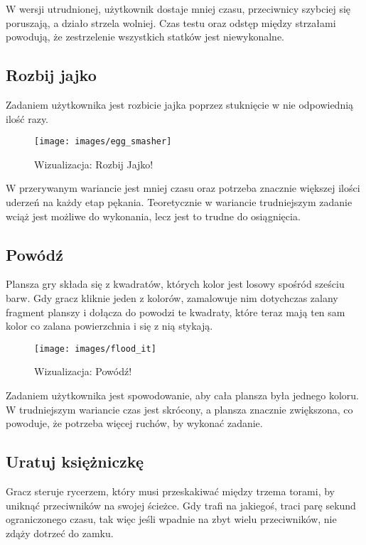 \documentclass[openright]{xmgr}
\begin{document}
W wersji utrudnionej, użytkownik dostaje mniej czasu, przeciwnicy szybciej
się poruszają, a działo strzela wolniej. Czas testu oraz odstęp między
strzałami powodują, że zestrzelenie wszystkich statków jest niewykonalne.

\subsection{Rozbij jajko}
Zadaniem użytkownika jest rozbicie jajka poprzez stuknięcie w nie
odpowiednią ilość razy.

\begin{figure}[h]
\centering
\texttt{[image: images/egg\_smasher]}
\caption{Wizualizacja: Rozbij Jajko!}
\label{fig:egg_smasher}
\end{figure}

W przerywanym wariancie jest mniej czasu oraz potrzeba znacznie większej
ilości uderzeń na każdy etap pękania. Teoretycznie w wariancie trudniejszym
zadanie wciąż jest możliwe do wykonania, lecz jest to trudne do osiągnięcia.

\subsection{Powódź}
Plansza gry składa się z kwadratów, których kolor jest losowy spośród sześciu
barw. Gdy gracz kliknie jeden z kolorów, zamalowuje nim dotychczas zalany
fragment planszy i dołącza do powodzi te kwadraty, które
teraz mają ten sam kolor co zalana powierzchnia i się z nią stykają.


\begin{figure}[h]
\centering
\texttt{[image: images/flood\_it]}
\caption{Wizualizacja: Powódź!}
\label{fig:flood_it}
\end{figure}

Zadaniem użytkownika jest spowodowanie, aby cała plansza była jednego koloru.
W trudniejszym wariancie czas jest skrócony, a plansza znacznie zwiększona, co powoduje, że potrzeba więcej ruchów, by wykonać zadanie.

\subsection{Uratuj księżniczkę}
Gracz steruje rycerzem, który musi przeskakiwać między trzema torami, by uniknąć przeciwników na swojej ścieżce. Gdy trafi na jakiegoś, traci parę sekund ograniczonego czasu, tak więc jeśli wpadnie na zbyt wielu przeciwników, nie zdąży dotrzeć do zamku.
\end{document}
